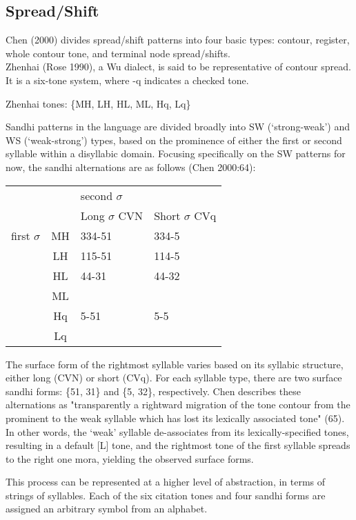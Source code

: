\documentclass{article}
\begin{document}
\subsection{Spread/Shift}
Chen (2000) divides spread/shift patterns into four basic types: contour, register, whole contour tone, and terminal node spread/shifts.\\
Zhenhai (Rose 1990), a Wu dialect, is said to be representative of contour spread. It is a six-tone system, where -q indicates a checked tone.
\begin{exe}
\ex
Zhenhai tones: \{MH, LH, HL, ML, Hq, Lq\}
\end{exe}
Sandhi patterns in the language are divided broadly into SW (`strong-weak') and WS (`weak-strong') types, based on the prominence of either the first or second syllable within a disyllabic domain. Focusing specifically on the SW patterns for now, the sandhi alternations are as follows (Chen 2000:64):\\
\begin{exe}
\ex
\begin{tabular}[t]{|r|c|l|l|}
\hline
&&  second $\sigma$ & \\
&& Long $\sigma$ CVN & Short $\sigma$ CVq \\
\hline
first $\sigma$ & MH & 334-51 & 334-5 \\
& LH & 115-51 & 114-5 \\
& HL & 44-31 & 44-32 \\
& ML &&\\
& Hq & 5-51 & 5-5 \\
& Lq &&\\
\hline
\end{tabular}
\end{exe}
The surface form of the rightmost syllable varies based on its syllabic structure, either long (CVN) or short (CVq). For each syllable type, there are two surface sandhi forms: \{51, 31\} and \{5, 32\}, respectively. Chen describes these alternations as "transparently a rightward migration of the tone contour from the prominent to the weak syllable which has lost its lexically associated tone" (65). In other words, the `weak' syllable de-associates from its lexically-specified tones, resulting in a default [L] tone, and the rightmost tone of the first syllable spreads to the right one mora, yielding the observed surface forms. \par
This process can be represented at a higher level of abstraction, in terms of strings of syllables. Each of the six citation tones and four sandhi forms are assigned an arbitrary symbol from an alphabet.
\end{document}
